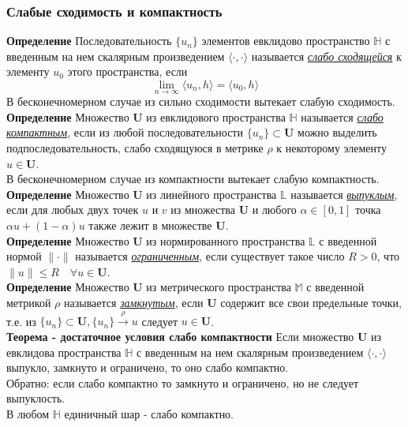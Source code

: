 \documentclass[A4]{article}
\begin{document}
\subsubsection{Слабые сходимость и компактность}
\textbf{Определение} Последовательность $\{u_n\}$ элементов евклидово пространство $\mathbb{H}$ с введенным на нем скалярным произведением $\langle\cdot,\cdot\rangle$ называется \underline{\emph{слабо сходящейся}} к элементу $u_0$ этого пространства, если
\begin{equation*}
\lim_{n\rightarrow\infty}\langle u_n,h\rangle=\langle u_0,h\rangle
\end{equation*}
В бесконечномерном случае из сильно сходимости вытекает слабую сходимость.\\
\textbf{Определение} Множество $\mathbf{U}$ из евклидового пространства $\mathbb{H}$ называется \underline{\emph{слабо компактным}}, если из любой последовательности $\{u_n\}\subset \mathbf{U}$ можно выделить подпоследовательность, слабо сходящуюся в метрике $\rho$ к некоторому элементу $u\in\mathbf{U}$.\\
В бесконечномерном случае из компактности вытекает слабую компактность.\\
\textbf{Определение} Множество $\mathbf{U}$ из линейного пространства $\mathbb{L}$ называется \underline{\emph{выпуклым}}, если для любых двух точек $u$ и $v$ из множества $\mathbf{U}$ и любого $\alpha\in[0,1]$ точка $\alpha u+(1-\alpha)u$ также лежит в множестве $\mathbf{U}$.\\
\textbf{Определение} Множество $\mathbf{U}$ из нормированного пространства $\mathbb{L}$ с введенной нормой $\|\cdot\|$ называется \underline{\emph{ограниченным}}, если существует такое число $R>0$, что $\|u\|\leqslant R\quad\forall u\in\mathbf{U}$.\\
\textbf{Определение} Множество $\mathbf{U}$ из метрического пространства $\mathbb{M}$ с введенной метрикой $\rho$ называется \underline{\emph{замкнутым}}, если $\mathbf{U}$ содержит все свои предельные точки, т.е. из $\{u_n\}\subset\mathbf{U},\{u_n\}\stackrel{\rho}{\rightarrow} u$ следует $u\in\mathbf{U}$.\\ 
\textbf{Теорема - достаточное условия слабо компактности} Если множество $\mathbf{U}$ из евклидова пространства $\mathbb{H}$ с введенным на нем скалярным произведением $\langle\cdot,\cdot\rangle$ выпукло, замкнуто и ограничено, то оно слабо компактно.\\
Обратно: если слабо компактно то замкнуто и ограничено, но не следует выпуклость.\\
В любом $\mathbb{H}$ единичный шар - слабо компактно.\\
\end{document}
